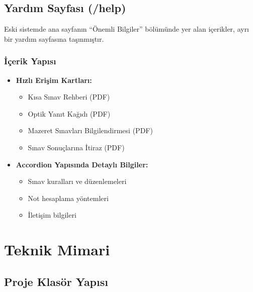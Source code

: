 \documentclass[12pt,a4paper]{article}
\begin{document}
\subsection{Yardım Sayfası (/help)}

Eski sistemde ana sayfanın ``Önemli Bilgiler'' bölümünde yer alan içerikler, ayrı bir yardım sayfasına taşınmıştır.

\subsubsection{İçerik Yapısı}

\begin{itemize}
    \item \textbf{Hızlı Erişim Kartları:}
    \begin{itemize}
        \item Kısa Sınav Rehberi (PDF)
        \item Optik Yanıt Kağıdı (PDF)
        \item Mazeret Sınavları Bilgilendirmesi (PDF)
        \item Sınav Sonuçlarına İtiraz (PDF)
    \end{itemize}
    
    \item \textbf{Accordion Yapısında Detaylı Bilgiler:}
    \begin{itemize}
        \item Sınav kuralları ve düzenlemeleri
        \item Not hesaplama yöntemleri
        \item İletişim bilgileri
    \end{itemize}
\end{itemize}

\section{Teknik Mimari}

\subsection{Proje Klasör Yapısı}
\end{document}
